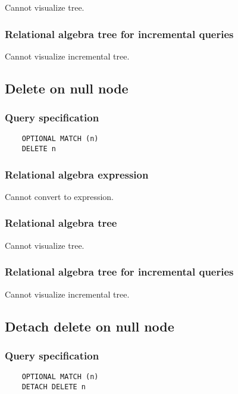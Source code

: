 	Cannot visualize tree.

	\subsubsection*{Relational algebra tree for incremental queries}

	Cannot visualize incremental tree.
	\subsection{Delete on null node}

	\subsubsection*{Query specification}

	\begin{lstlisting}
	OPTIONAL MATCH (n)
	DELETE n
	\end{lstlisting}


	\subsubsection*{Relational algebra expression}

	Cannot convert to expression.

	\subsubsection*{Relational algebra tree}

	Cannot visualize tree.

	\subsubsection*{Relational algebra tree for incremental queries}

	Cannot visualize incremental tree.
	\subsection{Detach delete on null node}

	\subsubsection*{Query specification}

	\begin{lstlisting}
	OPTIONAL MATCH (n)
	DETACH DELETE n
	\end{lstlisting}


